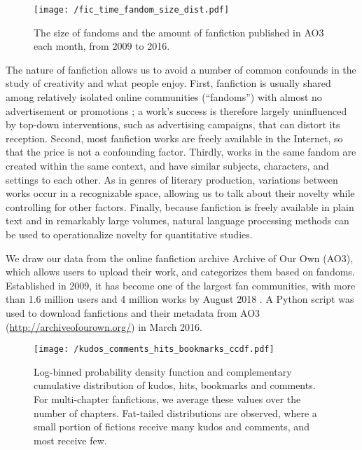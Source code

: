\documentclass[letterpaper]{article} %
\begin{document}
\begin{figure*}
    \centering
        \texttt{[image: /fic\_time\_fandom\_size\_dist.pdf]}
        \caption{The size of fandoms and the amount of fanfiction published in AO3 each month, from 2009 to 2016.}
        \label{fig:fandom_size}    
    \end{figure*}
    
The nature of fanfiction allows us to avoid a number of common confounds in the study of creativity and what people enjoy. First, fanfiction is usually shared among relatively isolated online communities (``fandoms'') with almost no advertisement or promotions \cite{wiki:fandom}; a work's success is therefore largely uninfluenced by top-down interventions, such as advertising campaigns, that can distort its reception. Second, most fanfiction works are freely available in the Internet, so that the price is not a confounding factor. Thirdly, works in the same fandom are created within the same context, and have similar subjects, characters, and settings to each other. As in genres of literary production, variations between works occur in a recognizable space, allowing us to talk about their novelty while controlling for other factors. Finally, because fanfiction is freely available in plain text and in remarkably large volumes, natural language processing methods can be used to operationalize novelty for quantitative studies. 



We draw our data from the online fanfiction archive Archive of Our Own (AO3), which allows users to upload their work, and categorizes them based on fandoms. Established in 2009, it has become one of the largest fan communities, with more than 1.6 million users and 4 million works by August 2018 \cite{ao3stats}. A Python script was used to download fanfictions and their metadata from AO3 (\url{http://archiveofourown.org/}) in March 2016. 

    
\begin{figure*}
    \centering
       \texttt{[image: /kudos\_comments\_hits\_bookmarks\_ccdf.pdf]}
        \caption{Log-binned probability density function and complementary cumulative distribution of kudos, hits, bookmarks and comments. For multi-chapter fanfictions, we average these values over the number of chapters. Fat-tailed distributions are observed, where a small portion of fictions receive many kudos and comments, and most receive few.}
        \label{fig:kudos_dist}
    \end{figure*}
\end{document}
